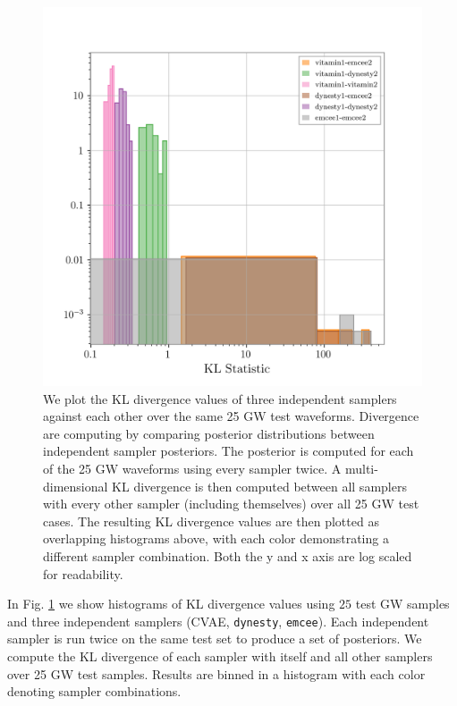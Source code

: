 \documentclass[%
showpacs,
 amsmath,amssymb,
 aps,
 twocolumn,
 prl,
 reprint,
floatfix,
]{revtex4-1}
\begin{document}
%
%
\begin{figure}
    \includegraphics[width=\columnwidth]{images/hist-kl.png}
    \caption{\label{fig:kl_results} We plot the KL divergence values 
    of three independent samplers against each other over the same 25 \ac{GW} 
    test waveforms. Divergence are computing by comparing posterior 
    distributions between independent sampler posteriors. The posterior 
    is computed for each of the 25 \ac{GW} waveforms using every sampler 
    twice. A multi-dimensional KL divergence is then computed 
    between all samplers 
    with every other sampler (including themselves) over all 25 \ac{GW} 
    test cases. The resulting KL divergence values are 
    then plotted as overlapping histograms 
    above, with each color demonstrating a different sampler combination. 
    Both the y and x axis are log scaled for readability.}
\end{figure}
%
In Fig. \ref{fig:kl_results} we show histograms of \ac{KL} divergence values 
using $25$ test GW samples and three independent samplers (\ac{CVAE}, 
\texttt{dynesty}, \texttt{emcee}). Each independent sampler is run twice 
on the same test set to produce a set of posteriors. We compute the KL divergence of each sampler with itself and all other samplers over 25 
\ac{GW} test samples. Results are binned in a histogram with each color 
denoting sampler combinations.
\end{document}
